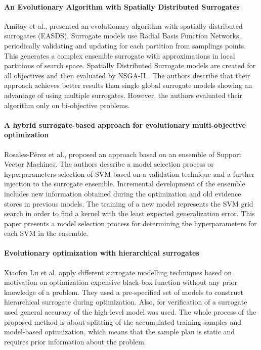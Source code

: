         \paragraph{An Evolutionary Algorithm with Spatially Distributed Surrogates} Amitay et al.,\cite{DistrSurr} presented an evolutionary algorithm with spatially distributed surrogates (EASDS). Surrogate models use Radial Basis Function Networks, periodically validating and updating for each partition from samplings points. This generates a complex ensemble surrogate with approximations in local partitions of search space. Spatially Distributed Surrogate models are created for all objectives and then evaluated by NSGA-II \cite{DistrSurr}. The authors describe that their approach achieves better results than single global surrogate models showing an advantage of using multiple surrogates. However, the authors evaluated their algorithm only on bi-objective problems.

        \paragraph{A hybrid surrogate-based approach for evolutionary multi-objective optimization} Rosales-Pérez et al.,\cite{HybridSurrRCG} proposed an approach based on an ensemble of Support Vector Machines. The authors describe a model selection process or hyperparameters selection of SVM based on a validation technique and a further injection to the surrogate ensemble. Incremental development of the ensemble includes new information obtained during the optimization and old evidence stores in previous models. 
        The training of a new model represents the SVM grid search in order to find a kernel with the least expected generalization error. This paper presents a model selection process for determining the hyperparameters for each SVM in the ensemble.


        \paragraph{Evolutionary optimization with hierarchical surrogates} Xiaofen Lu et al. \cite{LuST19} apply different surrogate modelling techniques based on motivation on optimization expensive black-box function without any prior knowledge of a problem. They used a pre-specified set of models to construct hierarchical surrogate during optimization. Also, for verification of a surrogate used general accuracy of the high-level model was used. The whole process of the proposed method is about splitting of the accumulated training samples and model-based optimization, which means that the sample plan is static and requires prior information about the problem. 

